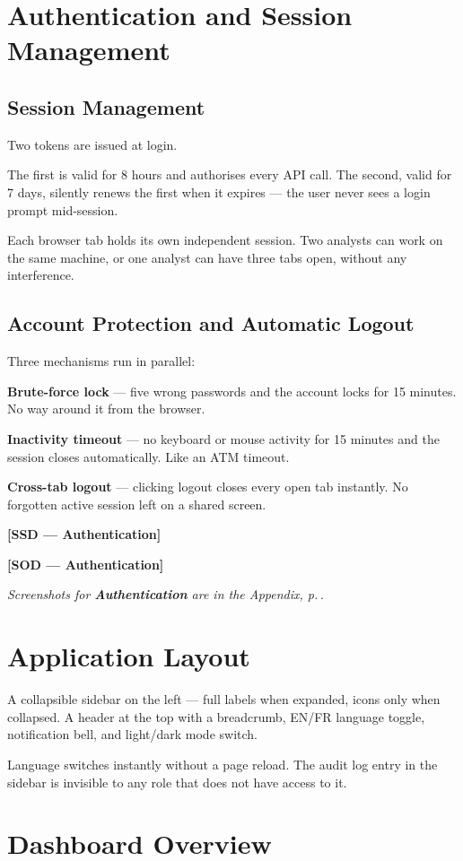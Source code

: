 \documentclass[12pt,a4paper]{report}
\newcommand{\ssd}[1]{\begin{placeholder}\textbf{[SSD --- #1]}\end{placeholder}\vspace{2pt}}
\newcommand{\sod}[1]{\begin{placeholder}\textbf{[SOD --- #1]}\end{placeholder}\vspace{4pt}}
\newcommand{\annexref}[1]{\begin{screenshotbox}\small\textit{Screenshots for \textbf{#1} are in the Appendix, p.\,\pageref{annex:#1}.}\end{screenshotbox}\vspace{4pt}}
\begin{document}
\section{Authentication and Session Management}

\subsection{Session Management}

Two tokens are issued at login.

The first is valid for 8 hours and authorises every API call. The second, valid for
7 days, silently renews the first when it expires --- the user never sees a login
prompt mid-session.

Each browser tab holds its own independent session. Two analysts can work on the
same machine, or one analyst can have three tabs open, without any interference.

\subsection{Account Protection and Automatic Logout}

Three mechanisms run in parallel:

\textbf{Brute-force lock} --- five wrong passwords and the account locks for 15
minutes. No way around it from the browser.

\textbf{Inactivity timeout} --- no keyboard or mouse activity for 15 minutes and
the session closes automatically. Like an ATM timeout.

\textbf{Cross-tab logout} --- clicking logout closes every open tab instantly.
No forgotten active session left on a shared screen.

\ssd{Authentication}
\sod{Authentication}
\annexref{Authentication}

\section{Application Layout}

A collapsible sidebar on the left --- full labels when expanded, icons only when
collapsed. A header at the top with a breadcrumb, EN/FR language toggle, notification
bell, and light/dark mode switch.

Language switches instantly without a page reload. The audit log entry in the sidebar
is invisible to any role that does not have access to it.

\section{Dashboard Overview}
\end{document}
